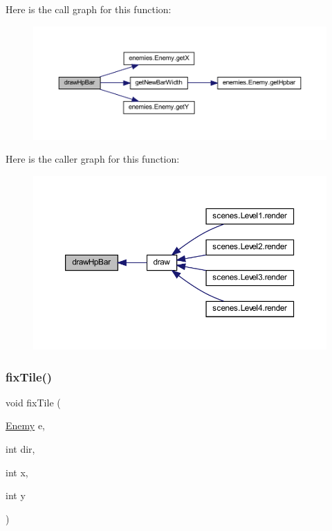 Here is the call graph for this function\+:\nopagebreak
\begin{figure}[H]
\begin{center}
\leavevmode
\includegraphics[width=350pt]{classmanagers_1_1_enemy_manager_a9c98cd29298e5f583c52dc46a6d70d46_cgraph}
\end{center}
\end{figure}
Here is the caller graph for this function\+:\nopagebreak
\begin{figure}[H]
\begin{center}
\leavevmode
\includegraphics[width=350pt]{classmanagers_1_1_enemy_manager_a9c98cd29298e5f583c52dc46a6d70d46_icgraph}
\end{center}
\end{figure}
\mbox{\label{classmanagers_1_1_enemy_manager_a01056d4d58ff52ab419ad8924922132d}} 
\subsubsection{\texorpdfstring{fix\+Tile()}{fixTile()}}
{\footnotesize\ttfamily void fix\+Tile (\begin{DoxyParamCaption}\item[{\hyperlink{classenemies_1_1_enemy}{Enemy}}]{e,  }\item[{int}]{dir,  }\item[{int}]{x,  }\item[{int}]{y }\end{DoxyParamCaption})}




